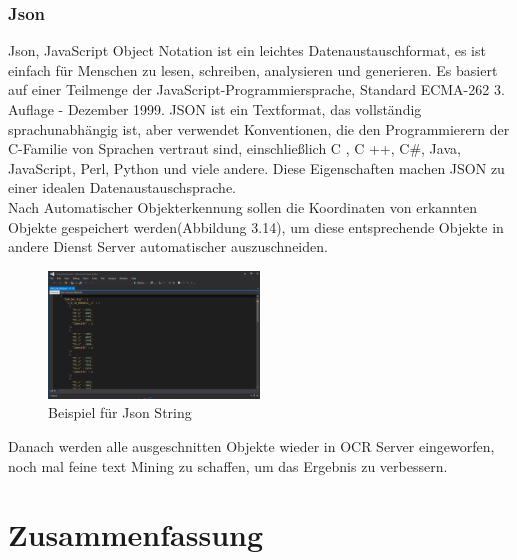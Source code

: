 \documentclass[10pt,a4paper]{report}
\begin{document}
\subsection{Json}
Json, JavaScript Object Notation ist ein leichtes Datenaustauschformat, es ist einfach für Menschen zu lesen, schreiben, analysieren und generieren. Es basiert auf einer Teilmenge der JavaScript-Programmiersprache, Standard ECMA-262 3. Auflage - Dezember 1999\cite{8}. JSON ist ein Textformat, das vollständig sprachunabhängig ist, aber verwendet Konventionen, die den Programmierern der C-Familie von Sprachen vertraut sind, einschließlich C , C ++, C\#, Java, JavaScript, Perl, Python und viele andere. Diese Eigenschaften machen JSON zu einer idealen Datenaustauschsprache.\\
Nach Automatischer Objekterkennung sollen die Koordinaten von erkannten Objekte gespeichert werden(Abbildung 3.14), um diese entsprechende Objekte in andere Dienst Server automatischer auszuschneiden. \\
\begin{figure}[htbp] 
	\centering
	\includegraphics[width=0.5\textwidth]{Json.png}
	\caption{Beispiel für Json String}
	\label{fig:Bild 3.14}
\end{figure}
Danach werden alle ausgeschnitten Objekte wieder in OCR Server eingeworfen, noch mal feine text Mining zu schaffen, um das Ergebnis zu verbessern.

\chapter{Zusammenfassung}
\end{document}
